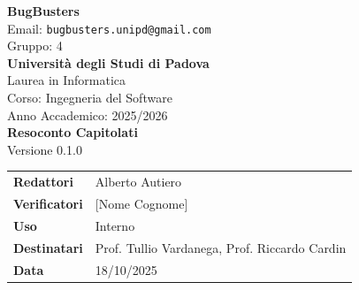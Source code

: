 \documentclass[a4paper,12pt]{article}
\newcommand{\CurrentVersion}{0.1.0} %
\begin{document}
\begin{center}
  {\Large\bfseries\color{primaryblue} BugBusters}\\[0.3cm]
  {\small\color{darkgray} Email: \texttt{bugbusters.unipd@gmail.com}} \\[0.1cm]
  {\small\color{darkgray} Gruppo: 4} \\[0.5cm]

  {\large\bfseries Università degli Studi di Padova}\\[0.3cm]
  {\small Laurea in Informatica}\\[0.2cm]
  {\small Corso: Ingegneria del Software}\\[0.2cm]
  {\small Anno Accademico: 2025/2026}\\[0.8cm]

  {\Huge\bfseries\color{primaryblue} Resoconto Capitolati}\\[0.8cm]
  {\Large\color{secondaryblue} Versione \CurrentVersion}\\[0.8cm]
\end{center}

\begin{center}
\begin{tcolorbox}[colback=lightgray,colframe=primaryblue,width=0.85\textwidth,arc=3mm,boxrule=0.5pt]
\begin{tabular}{@{}ll@{}}
\textbf{Redattori}    & Alberto Autiero \\
\textbf{Verificatori} & [Nome Cognome] \\
\textbf{Uso}          & Interno \\
\textbf{Destinatari}  & Prof. Tullio Vardanega, Prof. Riccardo Cardin \\
\textbf{Data}         & 18/10/2025 \\
\end{tabular}
\end{tcolorbox}
\end{center}
\end{document}
